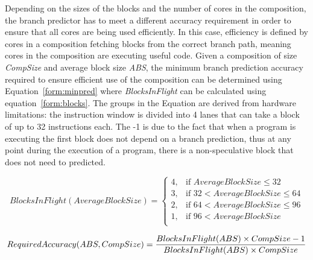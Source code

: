 Depending on the sizes of the blocks and the number of cores in the composition, the branch predictor has to meet a different accuracy requirement in order to ensure that all cores are being used efficiently.
In this case, efficiency is defined by cores in a composition fetching blocks from the correct branch path, meaning cores in the composition are executing useful code.
Given a composition of size \textit{CompSize} and average block size \textit{ABS}, the minimum branch prediction accuracy required to ensure efficient use of the composition can be determined using Equation~\ref{form:minpred} where \textit{BlocksInFlight} can be calculated using equation~\ref{form:blocks}.
The groups in the Equation are derived from hardware limitations: the instruction window is divided into 4 lanes that can take a block of up to 32 instructions each.
The -1 is due to the fact that when a program is executing the first block does not depend on a branch prediction, thus at any point during the execution of a program, there is a non-speculative block that does not need to predicted.

\begin{equation}\label{form:blocks}
BlocksInFlight(AverageBlockSize) = \begin{cases}
4, &\text{if } AverageBlockSize \le 32 \\
3, &\text{if } 32 < AverageBlockSize \le 64 \\
2, &\text{if } 64 < AverageBlockSize \le 96\\
1, &\text{if } 96 < AverageBlockSize\\
\end{cases}
\end{equation}

\begin{equation}\label{form:minpred}
RequiredAccuracy(ABS,CompSize)= \frac{BlocksInFlight(ABS) \times CompSize- 1}{BlocksInFlight(ABS) \times CompSize}
\vspace{1em}
\end{equation}


